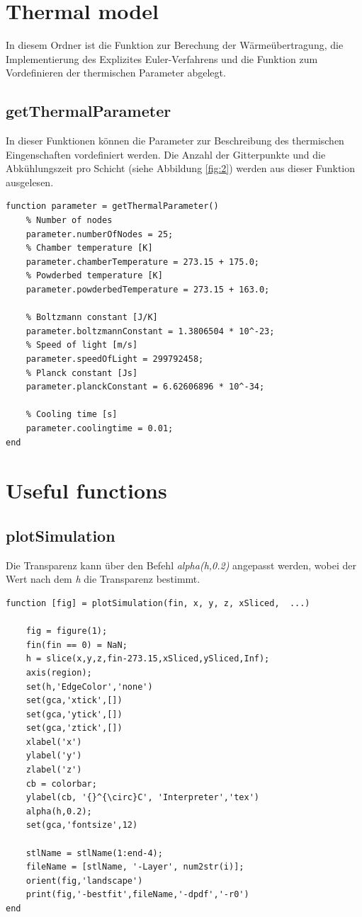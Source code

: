 \documentclass{scrartcl}
\begin{document}
\section{Thermal model}\label{sec:thermalModel}

In diesem Ordner ist die Funktion zur Berechung der Wärmeübertragung, die Implementierung des Explizites Euler-Verfahrens und die Funktion zum Vordefinieren der thermischen Parameter abgelegt.

\subsection{getThermalParameter}\label{subsec:getThermalParameter}

In dieser Funktionen können die Parameter zur Beschreibung des thermischen Eingenschaften vordefiniert werden. Die Anzahl der Gitterpunkte und die Abkühlungszeit pro Schicht (siehe Abbildung \ref{fig:2}) werden aus dieser Funktion ausgelesen. 

\begin{lstlisting}
function parameter = getThermalParameter()
    % Number of nodes
    parameter.numberOfNodes = 25;
    % Chamber temperature [K]
    parameter.chamberTemperature = 273.15 + 175.0;
    % Powderbed temperature [K]
    parameter.powderbedTemperature = 273.15 + 163.0;
    
    % Boltzmann constant [J/K]
    parameter.boltzmannConstant = 1.3806504 * 10^-23;
    % Speed of light [m/s]
    parameter.speedOfLight = 299792458;
    % Planck constant [Js]
    parameter.planckConstant = 6.62606896 * 10^-34;
    
    % Cooling time [s]
    parameter.coolingtime = 0.01;
end
\end{lstlisting}

\section{Useful functions}\label{sec:usefulFunctions}

\subsection{plotSimulation}\label{subsec:plotSimulation}

Die Transparenz kann über den Befehl \textit{alpha(h,0.2)} angepasst werden, wobei der Wert nach dem \textit{h} die Transparenz bestimmt.

\begin{lstlisting}
function [fig] = plotSimulation(fin, x, y, z, xSliced,  ...)
    
    fig = figure(1);
    fin(fin == 0) = NaN;
    h = slice(x,y,z,fin-273.15,xSliced,ySliced,Inf);
    axis(region);
    set(h,'EdgeColor','none')
    set(gca,'xtick',[])
    set(gca,'ytick',[])
    set(gca,'ztick',[])
    xlabel('x')
    ylabel('y')
    zlabel('z')
    cb = colorbar;
    ylabel(cb, '{}^{\circ}C', 'Interpreter','tex')
    alpha(h,0.2);
    set(gca,'fontsize',12)
    
    stlName = stlName(1:end-4);
    fileName = [stlName, '-Layer', num2str(i)];
    orient(fig,'landscape')
    print(fig,'-bestfit',fileName,'-dpdf','-r0')
end
\end{lstlisting}
\end{document}
